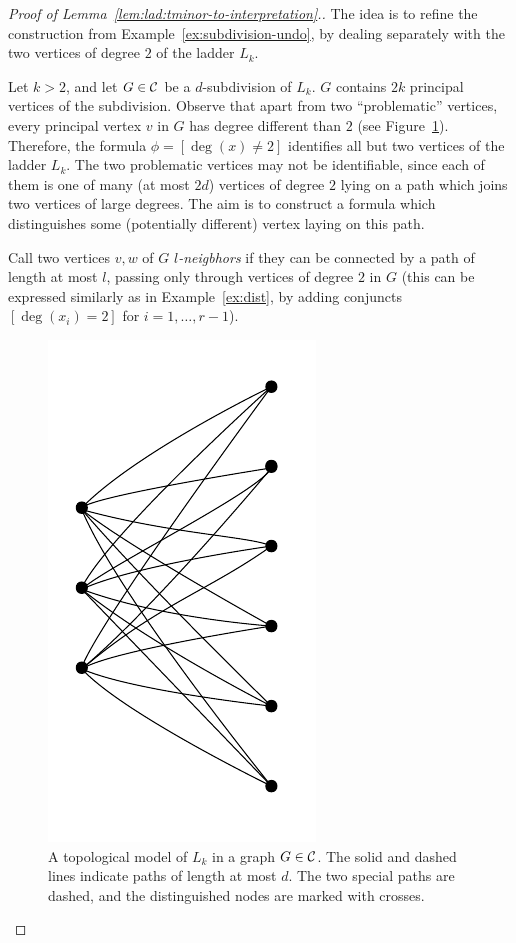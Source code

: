 \begin{proof}[Proof of Lemma~\ref{lem:lad:tminor-to-interpretation}.]
The idea is to refine the construction from Example~\ref{ex:subdivision-undo}, by dealing separately with the two vertices of degree $2$ of the ladder $L_k$.

    Let $k>2$, and let 
  $G\in{\cal C}$ be a $d$-subdivision of $L_k$. $G$ contains 
  $2k$ principal vertices of the subdivision.  
   Observe that apart from two ``problematic'' vertices,  every principal vertex $v$ in $G$ has degree different than $2$ (see Figure~\ref{fig:ladmod}). 
Therefore, the formula $\phi=[\deg(x)\neq 2]$
identifies all but two vertices of the ladder $L_k$.
The two problematic vertices may  not be identifiable, since each of them is one of many (at most $2d$) vertices of degree $2$
 lying on a path which joins two vertices of large degrees.
The aim is to construct a formula  which distinguishes some (potentially different) vertex  laying on this path.
 
 Call two vertices $v,w$ of $G$ \emph{$l$-neigbhors} if 
they can be connected by a path of length at most $l$, passing only through vertices of degree $2$ in $G$
 (this can be expressed similarly as in Example~\ref{ex:dist}, by adding conjuncts   $[\deg(x_i)=2]$ for $i=1,\ldots,r-1$). 
 


\begin{figure}[h]
  \centering
    \includegraphics[scale=0.25,page=13]{pictures.pdf}
  \caption{A topological model  of $L_{k}$ in a graph $G\in {\cal C}$. The solid and dashed lines indicate paths of length at most $d$. 
    The two special paths are dashed, and the distinguished nodes are marked with crosses.} 
  \label{fig:ladmod}
\end{figure}
  

\end{proof}
